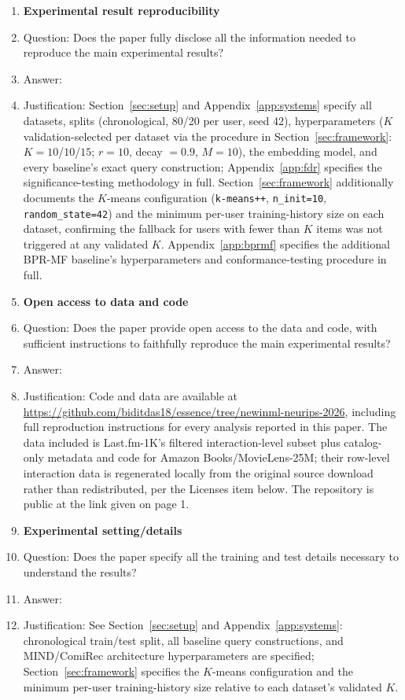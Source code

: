 \documentclass{article}
\begin{document}
\begin{enumerate}
\item {\bf Experimental result reproducibility}
    \item[] Question: Does the paper fully disclose all the information needed to reproduce the main experimental results?
    \item[] Answer: \answerYes{}
    \item[] Justification: Section~\ref{sec:setup} and Appendix~\ref{app:systems} specify all datasets, splits (chronological, 80/20 per user, seed 42), hyperparameters ($K$ validation-selected per dataset via the procedure in Section~\ref{sec:framework}: $K=10$/$10$/$15$; $r=10$, decay $=0.9$, $M=10$), the embedding model, and every baseline's exact query construction; Appendix~\ref{app:fdr} specifies the significance-testing methodology in full. Section~\ref{sec:framework} additionally documents the $K$-means configuration (\texttt{k-means++}, \texttt{n\_init=10}, \texttt{random\_state=42}) and the minimum per-user training-history size on each dataset, confirming the fallback for users with fewer than $K$ items was not triggered at any validated $K$. Appendix~\ref{app:bprmf} specifies the additional BPR-MF baseline's hyperparameters and conformance-testing procedure in full.

\item {\bf Open access to data and code}
    \item[] Question: Does the paper provide open access to the data and code, with sufficient instructions to faithfully reproduce the main experimental results?
    \item[] Answer: \answerYes{}
    \item[] Justification: Code and data are available at \url{https://github.com/biditdas18/essence/tree/newinml-neurips-2026}, including full reproduction instructions for every analysis reported in this paper. The data included is Last.fm-1K's filtered interaction-level subset plus catalog-only metadata and code for Amazon Books/MovieLens-25M; their row-level interaction data is regenerated locally from the original source download rather than redistributed, per the Licenses item below. The repository is public at the link given on page 1.

\item {\bf Experimental setting/details}
    \item[] Question: Does the paper specify all the training and test details necessary to understand the results?
    \item[] Answer: \answerYes{}
    \item[] Justification: See Section~\ref{sec:setup} and Appendix~\ref{app:systems}: chronological train/test split, all baseline query constructions, and MIND/ComiRec architecture hyperparameters are specified; Section~\ref{sec:framework} specifies the $K$-means configuration and the minimum per-user training-history size relative to each dataset's validated $K$.


\end{enumerate}
\end{document}
